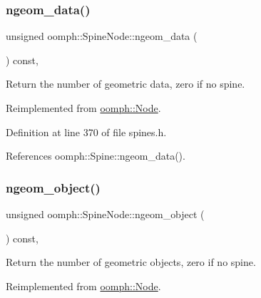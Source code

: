 \mbox{\label{classoomph_1_1SpineNode_a46735b4f430014997c525134c0889b4d}} 
\subsubsection{\texorpdfstring{ngeom\+\_\+data()}{ngeom\_data()}}
{\footnotesize\ttfamily unsigned oomph\+::\+Spine\+Node\+::ngeom\+\_\+data (\begin{DoxyParamCaption}{ }\end{DoxyParamCaption}) const\hspace{0.3cm}{\ttfamily [inline]}, {\ttfamily [virtual]}}



Return the number of geometric data, zero if no spine. 



Reimplemented from \hyperlink{classoomph_1_1Node_ad20302b7992437075d3ca42390b39f24}{oomph\+::\+Node}.



Definition at line 370 of file spines.\+h.



References oomph\+::\+Spine\+::ngeom\+\_\+data().

\mbox{\label{classoomph_1_1SpineNode_afba3d62d2da3b8fa6421958fda3f0a14}} 
\subsubsection{\texorpdfstring{ngeom\+\_\+object()}{ngeom\_object()}}
{\footnotesize\ttfamily unsigned oomph\+::\+Spine\+Node\+::ngeom\+\_\+object (\begin{DoxyParamCaption}{ }\end{DoxyParamCaption}) const\hspace{0.3cm}{\ttfamily [inline]}, {\ttfamily [virtual]}}



Return the number of geometric objects, zero if no spine. 



Reimplemented from \hyperlink{classoomph_1_1Node_a2c0fb79493f94d2ce19736737ebf5447}{oomph\+::\+Node}.



